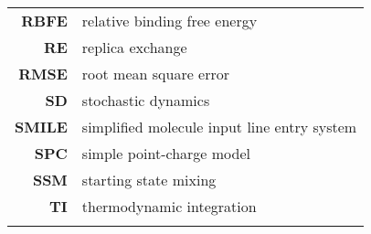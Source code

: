 \begin{center}
\begin{longtable}{ >{\bfseries}r l}
 RBFE & relative binding free energy \\
 RE   & replica exchange\\
 RMSE & root mean square error\\

 SD   & stochastic dynamics\\
 SMILE & simplified molecule input line entry system\\
 SPC  & simple point-charge model\\
 SSM  & starting state mixing \\
 
 TI   & thermodynamic integration \\
\label{tab:abbreviations}
\end{longtable}
\end{center}
